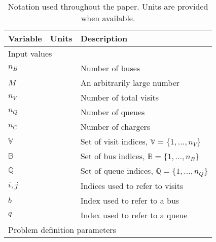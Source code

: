 \documentclass[utf8]{FrontiersinHarvard}
\begin{document}
\begin{table}[!htpb]
  \caption{Notation used throughout the paper. Units are provided when available.}
  \label{tab:variables}
  \centering
  \begin{tabularx}{\textwidth}{l l l}
    \toprule
    \textbf{Variable} & \textbf{Units} & \textbf{Description}                                                                               \\
    \toprule
    \multicolumn{3}{l}{Input values}                                                                                       \\
    \hline
    $n_B$        & & Number of buses                                                                                                \\
    $M$          & & An arbitrarily large number                                                                                    \\
    $n_V$        & & Number of total visits                                                                                         \\
    $n_Q$        & & Number of queues                                                                                               \\
    $n_C$        & & Number of chargers                                                                                             \\
    $\mathbb{V}$ & & Set of visit indices, $\mathbb{V} = \{1, ..., n_V\}$                                                           \\
    $\mathbb{B}$ & & Set of bus indices, $\mathbb{B} = \{1, ..., n_B\}$                                                             \\
    $\mathbb{Q}$          & & Set of queue indices, $\mathbb{Q} = \{1, ..., n_Q\}$                                                                    \\
    $i,j$        & & Indices used to refer to visits                                                                                \\
    $b$          & & Index used to refer to a bus                                                                                   \\
    $q$          & & Index used to refer to a queue                                                                                 \\
    \hline
    \multicolumn{3}{l}{Problem definition parameters}                                                                               \\

\end{tabularx}
\end{table}
\end{document}
